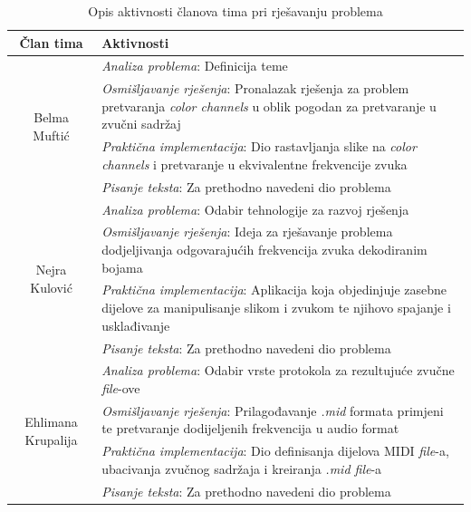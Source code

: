 \documentclass[12pt,a4paper]{article}
\begin{document}
\begin{table}[H]
\centering
\begin{tabular}{| c | p{12 cm} |}
\hline
\textbf{Član tima}					& \textbf{Aktivnosti}		\\ \hline
\multirow{4}{*}{Belma Muftić}		& \textit{Analiza problema}: Definicija teme \\
								& \textit{Osmišljavanje rješenja}: Pronalazak rješenja za problem pretvaranja \textit{color channels} u oblik pogodan za pretvaranje u zvučni sadržaj \\
								& \textit{Praktična implementacija}: Dio rastavljanja slike na \textit{color channels} i pretvaranje u ekvivalentne frekvencije zvuka \\
								& \textit{Pisanje teksta}: Za prethodno navedeni dio problema \\ \hline
\multirow{4}{*}{Nejra Kulović}		& \textit{Analiza problema}: Odabir tehnologije za razvoj rješenja \\
								& \textit{Osmišljavanje rješenja}: Ideja za rješavanje problema dodjeljivanja odgovarajućih frekvencija zvuka dekodiranim bojama \\
								& \textit{Praktična implementacija}: Aplikacija koja objedinjuje zasebne dijelove za manipulisanje slikom i zvukom te njihovo spajanje i usklađivanje \\
								& \textit{Pisanje teksta}: Za prethodno navedeni dio problema \\ \hline
\multirow{4}{*}{Ehlimana Krupalija} & \textit{Analiza problema}: Odabir vrste protokola za rezultujuće zvučne \textit{file}-ove \\
								& \textit{Osmišljavanje rješenja}: Prilagođavanje \textit{.mid} formata primjeni te pretvaranje dodijeljenih frekvencija u audio format \\
								& \textit{Praktična implementacija}: Dio definisanja dijelova MIDI \textit{file}-a, ubacivanja zvučnog sadržaja i kreiranja \textit{.mid file}-a \\
								& \textit{Pisanje teksta}: Za prethodno navedeni dio problema \\ \hline
\end{tabular}
\caption{Opis aktivnosti članova tima pri rješavanju problema}
\end{table}

\newpage

\tableofcontents

\newpage

\setcounter{page}{1}
\end{document}
